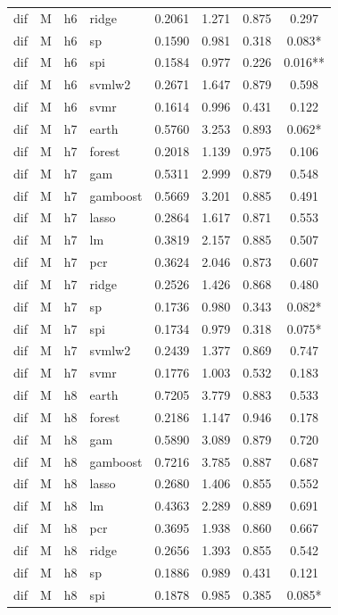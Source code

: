 \begin{ThreePartTable}
\begin{longtable}[t]{llclcccc}
dif & M & h6 & ridge & 0.2061 & 1.271 & 0.875 & 0.297\\
dif & M & h6 & sp & 0.1590 & 0.981 & 0.318 & 0.083*\\
dif & M & h6 & spi & 0.1584 & 0.977 & 0.226 & 0.016**\\
dif & M & h6 & svmlw2 & 0.2671 & 1.647 & 0.879 & 0.598\\
dif & M & h6 & svmr & 0.1614 & 0.996 & 0.431 & 0.122\\
\addlinespace
dif & M & h7 & earth & 0.5760 & 3.253 & 0.893 & 0.062*\\
dif & M & h7 & forest & 0.2018 & 1.139 & 0.975 & 0.106\\
dif & M & h7 & gam & 0.5311 & 2.999 & 0.879 & 0.548\\
dif & M & h7 & gamboost & 0.5669 & 3.201 & 0.885 & 0.491\\
dif & M & h7 & lasso & 0.2864 & 1.617 & 0.871 & 0.553\\
dif & M & h7 & lm & 0.3819 & 2.157 & 0.885 & 0.507\\
dif & M & h7 & pcr & 0.3624 & 2.046 & 0.873 & 0.607\\
dif & M & h7 & ridge & 0.2526 & 1.426 & 0.868 & 0.480\\
dif & M & h7 & sp & 0.1736 & 0.980 & 0.343 & 0.082*\\
dif & M & h7 & spi & 0.1734 & 0.979 & 0.318 & 0.075*\\
dif & M & h7 & svmlw2 & 0.2439 & 1.377 & 0.869 & 0.747\\
dif & M & h7 & svmr & 0.1776 & 1.003 & 0.532 & 0.183\\
\addlinespace
dif & M & h8 & earth & 0.7205 & 3.779 & 0.883 & 0.533\\
dif & M & h8 & forest & 0.2186 & 1.147 & 0.946 & 0.178\\
dif & M & h8 & gam & 0.5890 & 3.089 & 0.879 & 0.720\\
dif & M & h8 & gamboost & 0.7216 & 3.785 & 0.887 & 0.687\\
dif & M & h8 & lasso & 0.2680 & 1.406 & 0.855 & 0.552\\
dif & M & h8 & lm & 0.4363 & 2.289 & 0.889 & 0.691\\
dif & M & h8 & pcr & 0.3695 & 1.938 & 0.860 & 0.667\\
dif & M & h8 & ridge & 0.2656 & 1.393 & 0.855 & 0.542\\
dif & M & h8 & sp & 0.1886 & 0.989 & 0.431 & 0.121\\
dif & M & h8 & spi & 0.1878 & 0.985 & 0.385 & 0.085*\\

\end{longtable}
\end{ThreePartTable}

